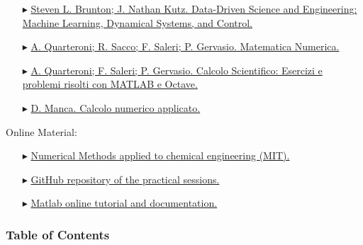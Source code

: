 \documentclass[xcolor={dvipsnames,rgb}, aspectratio=169]{beamer}
\begin{document}
\begin{frame}{}
   \begin{itemize}
      \item[$\blacktriangleright$]
         \href{https://www.amazon.it/Data-Driven-Science-Engineering-Learning-Dynamical/dp/1009098489/ref=asc_df_1009098489/?tag=googshopit-21&linkCode=df0&hvadid=560287860614&hvpos=&hvnetw=g&hvrand=14266207767663986773&hvpone=&hvptwo=&hvqmt=&hvdev=c&hvdvcmdl=&hvlocint=&hvlocphy=1008463&hvtargid=pla-1599460130783&psc=1}{\footnotesize
         Steven L. Brunton; J. Nathan Kutz. Data-Driven Science and Engineering: Machine
         Learning, Dynamical Systems, and Control.}
      \item[$\blacktriangleright$]
         \href{https://link.springer.com/book/10.1007/978-88-470-5644-2}{\footnotesize A.
         Quarteroni; R. Sacco; F. Saleri; P. Gervasio. Matematica Numerica.}
      \item[$\blacktriangleright$]
         \href{https://www.amazon.it/Calcolo-Scientifico-Esercizi-problemi-risolti-dp-8847039525/dp/8847039525/ref=dp_ob_title_bk}{\footnotesize
         A. Quarteroni; F. Saleri; P. Gervasio. Calcolo Scientifico: Esercizi e problemi
         risolti con MATLAB e Octave.}
      \item[$\blacktriangleright$]
         \href{https://www.ibs.it/calcolo-numerico-applicato-libro-davide-manca/e/9788837116972}{\footnotesize
         D. Manca. Calcolo numerico applicato.}
   \end{itemize}
   \small \alert{Online Material}:
      \begin{itemize}
         \item[$\blacktriangleright$]
            \href{https://ocw.mit.edu/courses/10-34-numerical-methods-applied-to-chemical-engineering-fall-2015/pages/syllabus/}{\footnotesize
            Numerical Methods applied to chemical engineering (MIT).}
         \item[$\blacktriangleright$]
            \href{https://github.com/Titodinelli/Calcoli-di-Processo-dell-Ingegneria-Chimica}{\footnotesize
            GitHub repository of the practical sessions.}
         \item[$\blacktriangleright$]
            \href{https://it.mathworks.com/help/matlab/getting-started-with-matlab.html}{\footnotesize
            Matlab online tutorial and documentation.}
    \end{itemize}
\end{frame}

\begin{frame}
   \frametitle{Table of Contents}
   \hypersetup{linkcolor=black}{\tableofcontents}
\end{frame}
\end{document}
